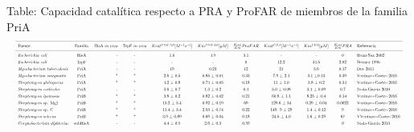 \documentclass[12pt,twoside]{reedthesis}
\begin{document}
  \begin{landscape}  
  Table: Capacidad catalítica respecto a PRA y ProFAR de miembros de la familia PriA \label{tab:cineticos} 
  $$
  \resizebox{\columnwidth}{!}{%
  \begin{tabular}{ l c r c c c c c c c l}
  \hline \\ [-1.5ex]
  Fuente  &Familia & HisA $in\hspace{.1cm}vivo$ &TrpF $in\hspace{.1cm}vivo$ & $K{cat}^{ProFAR}[M^{-1}s^{-1}]$ & $Km^{ProFAR}[\mu M]$& $\frac{K{cat}}{Km} ProFAR$ & $K{cat}^{PRA}[M^{-1}s^{-1}]$ & $Km^{PRA}[\mu M]$  &  $\frac{Kcat}{Km} PRA $  &Referencia  \\ [1ex]
  \hline \\ [-1.5ex]  
  \textit{Escherichia} \textit{coli}         & HisA &- &- & 1.6 & 4.9 & 3.1 & -   & -   & 0   & Henn-Sax 2002 \\ [1ex]  
  \textit{Escherichia}  \textit{coli}        &TrpF  &- &- &-    &-    &0    & 12.2& 34.5& 2.82& Sterner 1996 \\ [1ex]    
  \textit{Mycobacterium} \textit{tuberculosis} &PriA&-&-&19&0.23&12&21&3.6&0.17& Due 2011\\ [1ex]    
  \textit{Mycobacterium}  \textit{smegmatis} &PriA&*&*& 2.6 ± 0.5 & 0.85 $ \pm $ 0.04 &0.33& 7.9 $ \pm $  2.4& 3.1 $ \pm $0.43  &0.39& Verduzco-Castro 2016 \\ [1ex]   
  \textit{Streptomyces} \textit{globisporus}  &PriA&*&*& 4.2 ± 0.8& 0.74 ± 0.03 &0.18& 11 ± 1.0 & 3.8 ± 0.2 &0.34& Verduzco-Castro 2016\\ [1ex]  
  \textit{Streptomyces} \textit{coelicolor} &PriA&-&-& 3.6 ± 0.7 & 1.3 ± 0.2 &0.4& 5.0 ± 0.08 & 3.4 ± 0.09 &0.7& Noda-Garcia 2010\\ [1ex]   
  \textit{Streptomyces} \textit{ipomoeae}  &PriB&*&*& 3.8 ± 0.2 & 0.82 ± 0.02 &0.21& 60.8 ± 1.1&  8.25 ± 0.4&0.14& Verduzco-Castro 2016\\ [1ex]   
  \textit{Streptomyces} sp. Mg1  &PriB&*&*& 13.2 ± 3.4 &0.92 ± 0.19 &69&129.6 ± 34 &0.29 ± 0.04&0.0022&Verduzco-Castro 2016\\ [1ex]  
  \textit{Streptomyces} sp. C&PriB&*&*&11.4 ± 3.4 &2.53 ± 0.74 &0.22&149. 9 ± 29& 1.4 ± 0.12 &9&Verduzco-Castro 2016\\ [1ex]    
  \textit{Streptomyces} \textit{sviceus} &PriB&*&*&3.9 ± 0.89 &0.69 ± 0.04 &0.18&24.5 ± 4.0& 1.6 ± 0.29 &67&VVerduzco-Castro 2016\\ [1ex]   
  \textit{Corynebacterium} \textit{diphteriae} &subHisA&-&-&4.4 ± 0.5&2.6 ± 0.3&0.59&&&0& Noda-Garcia 2013\\ [1ex]    

\end{tabular}}$$
\end{landscape}
\end{document}
